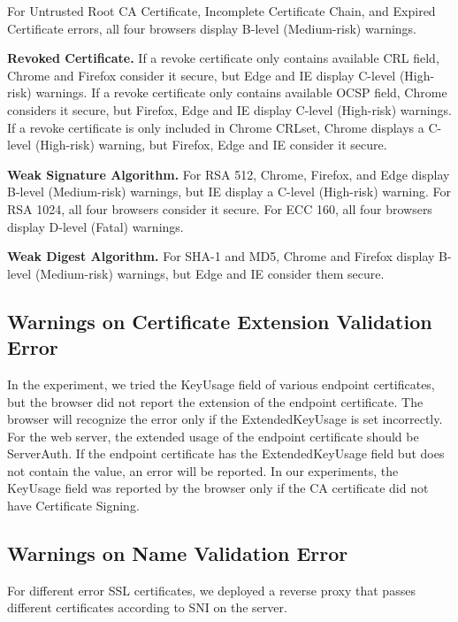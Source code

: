     For Untrusted Root CA Certificate, Incomplete Certificate Chain, and Expired Certificate errors, 
        all four browsers display B-level (Medium-risk) warnings.

\textbf{Revoked Certificate.}
    If a revoke certificate only contains available CRL field, 
        Chrome and Firefox consider it secure, 
            but Edge and IE display C-level (High-risk) warnings.
    If a revoke certificate only contains available OCSP field, 
        Chrome considers it secure, but Firefox, 
            Edge and IE display C-level (High-risk) warnings.
    If a revoke certificate is only included in Chrome CRLset, 
        Chrome displays a C-level (High-risk) warning, 
            but Firefox, Edge and IE consider it secure.

\textbf{Weak Signature Algorithm.}
    For RSA 512, 
        Chrome, Firefox, and Edge display B-level (Medium-risk) warnings, 
            but IE display a C-level (High-risk) warning.
    For RSA 1024, 
        all four browsers consider it secure.
    For ECC 160, 
        all four browsers display D-level (Fatal) warnings. 

\textbf{Weak Digest Algorithm.}
    For SHA-1 and MD5, 
        Chrome and Firefox display B-level (Medium-risk) warnings, 
            but Edge and IE consider them secure.

\subsection{Warnings on Certificate Extension Validation Error}

In the experiment, we tried the KeyUsage field of various endpoint certificates, but the browser did not report the extension of the endpoint certificate. The browser will recognize the error only if the ExtendedKeyUsage is set incorrectly. For the web server, the extended usage of the endpoint certificate should be ServerAuth. If the endpoint certificate has the ExtendedKeyUsage field but does not contain the value, an error will be reported. In our experiments, the KeyUsage field was reported by the browser only if the CA certificate did not have Certificate Signing.
\subsection{Warnings on Name Validation Error}
For different error SSL certificates, we deployed a reverse proxy that passes different certificates according to SNI on the server.

